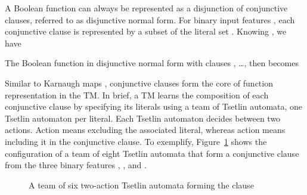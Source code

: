 \documentclass[letterpaper]{article}
\begin{document}
A Boolean function can always be represented as a disjunction of conjunctive clauses, referred to as disjunctive normal form. For binary input features , each conjunctive clause  is represented by a subset  of the literal set . Knowing , we have

The Boolean function  in disjunctive normal form with clauses , \ldots,  then becomes


Similar to Karnaugh maps \cite{karnaugh1953map}, conjunctive clauses form the core of function representation in the TM. In brief, a TM learns the composition of each conjunctive clause by specifying its literals using a team of  Tsetlin automata, one Tsetlin automaton per literal. Each Tsetlin automaton decides between two actions. Action  means excluding the associated literal, whereas action  means including it in the conjunctive clause. To exemplify, Figure~\ref{fig:tsetlin_automata_team} shows the configuration of a team of eight Tsetlin automata that form a conjunctive clause from the three binary features , , and .

\begin{figure}[ht]
\centering
{}
\caption{A team of six two-action Tsetlin automata forming the clause }
\label{fig:tsetlin_automata_team}
\end{figure}
\end{document}
